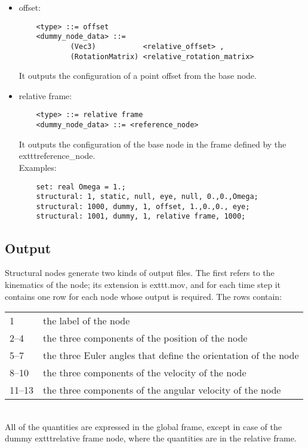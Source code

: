 \begin{itemize}

    \item offset:
    \begin{verbatim}
    <type> ::= offset
    <dummy_node_data> ::=
            (Vec3)           <relative_offset> ,
            (RotationMatrix) <relative_rotation_matrix>
    \end{verbatim}
    It outputs the configuration of a point offset from the base node.
            
    \item relative frame:
    \begin{verbatim}
    <type> ::= relative frame
    <dummy_node_data> ::= <reference_node>
    \end{verbatim}
    It outputs the configuration of the base node in the frame defined
    by the 	exttt{reference\_node}.\\
    Examples:
    \begin{verbatim}
    set: real Omega = 1.;
    structural: 1, static, null, eye, null, 0.,0.,Omega;
    structural: 1000, dummy, 1, offset, 1.,0.,0., eye;
    structural: 1001, dummy, 1, relative frame, 1000;
    \end{verbatim}

\end{itemize}

\subsection{Output}
Structural nodes generate two kinds of output files. 
The first refers to the kinematics of the node; its extension is 	exttt{.mov},
and for each time step it contains one row for each node whose output is
required.
The rows contain: \vspace{2mm} \\
\begin{tabular}{ll}
    \hline
    1      & the label of the node \\
    2--4   & the three components of the position of the node \\
    5--7   & the three Euler angles that define the orientation of the node \\
    8--10  & the three components of the velocity of the node \\
    11--13 & the three components of the angular velocity of the node \\
    \hline
\end{tabular}\vspace{2mm}\\
All of the quantities are expressed in the global frame, except in case of
the dummy 	exttt{relative frame} node, where the quantities are in the
relative frame.

